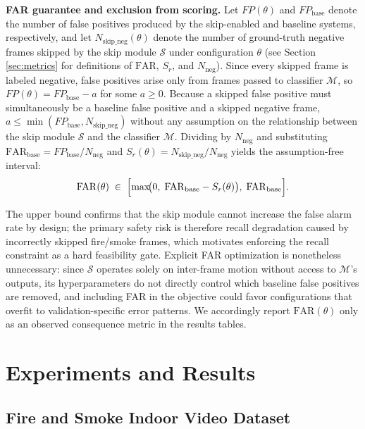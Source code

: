 \documentclass[
  10pt,
]{article}
\begin{document}
\textbf{FAR guarantee and exclusion from scoring.}
Let $FP(\theta)$ and $FP_{\text{base}}$ denote the number of false positives
produced by the skip-enabled and baseline systems, respectively, and let
$N_{\text{skip\_neg}}(\theta)$ denote the number of ground-truth negative frames
skipped by the skip module $\mathcal{S}$ under configuration $\theta$ (see
    Section \ref{sec:metrics} for definitions of $\mathrm{FAR}$, $S_r$, and
$N_{\text{neg}}$). Since every skipped frame is labeled negative, false
positives arise only from frames passed to classifier $\mathcal{M}$, so
$FP(\theta) = FP_{\text{base}} - a$ for some $a \geq 0$. Because a skipped false
positive must simultaneously be a baseline false positive and a skipped negative
frame, $a \leq \min(FP_{\text{base}}, N_{\text{skip\_neg}})$ without any
assumption on the relationship between the skip module $\mathcal{S}$
and the classifier $\mathcal{M}$. Dividing
by $N_{\text{neg}}$ and substituting $\mathrm{FAR}_{\text{base}} =
FP_{\text{base}}/N_{\text{neg}}$ and $S_r(\theta) =
N_{\text{skip\_neg}}/N_{\text{neg}}$ yields the assumption-free interval:
\begin{equation}\label{eq:far_interval}
    \mathrm{FAR}(\theta) \;\in\;
    \Bigl[\max\!\bigl(0,\;\mathrm{FAR}_{\text{base}} - S_r(\theta)\bigr),\;
    \mathrm{FAR}_{\text{base}}\Bigr].
\end{equation}

The upper bound confirms that the skip module cannot increase the false alarm
rate by design; the primary safety risk is therefore recall degradation caused
by incorrectly skipped fire/smoke frames, which motivates enforcing the recall
constraint as a hard feasibility gate. Explicit FAR optimization is nonetheless
unnecessary: since $\mathcal{S}$ operates solely on inter-frame motion without
access to $\mathcal{M}$'s outputs, its hyperparameters do not directly control
which baseline false positives are removed, and including FAR in the objective
could favor configurations that overfit to validation-specific error patterns.
We accordingly report $\mathrm{FAR}(\theta)$ only as an observed consequence
metric in the results tables.


\section{Experiments and Results}\label{sec:results}

\subsection{Fire and Smoke Indoor Video
Dataset}\label{fire-and-smoke-indoor-video-dataset}
\end{document}

